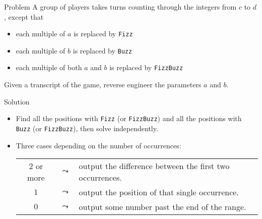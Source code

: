 \begin{frame}
  \frametitle{\problemtitle}
  \begin{block}{Problem}
    A group of players takes turns counting through the integers from $c$ to $d$, except that
    \vspace{-0.5em}
    \begin{itemize}
      \item each multiple of $a$ is replaced by \texttt{Fizz}
      \item each multiple of $b$ is replaced by \texttt{Buzz}
      \item each multiple of both $a$ and $b$ is replaced by \texttt{FizzBuzz}
    \end{itemize}
    \vspace{-0.5em}
    Given a transcript of the game, reverse engineer the parameters $a$ and $b$.
  \end{block}
  \pause
  \begin{block}{Solution}
    \begin{itemize}
      \item<+-> Find all the positions with \texttt{Fizz} (or
        \texttt{FizzBuzz}) and all the positions with \texttt{Buzz} (or
        \texttt{FizzBuzz}), then solve independently.
      \item<+-> Three cases depending on the number of occurrences:
        \begin{tabular}{c c l}
          $2$ or more & $\leadsto$ & output the difference between the first two occurrences. \\
          $1$ & $\leadsto$ & output the position of that single occurrence. \\
          $0$ & $\leadsto$ & output some number past the end of the range. \\
        \end{tabular}
    \end{itemize}
  \end{block}
  \solvestats
\end{frame}

